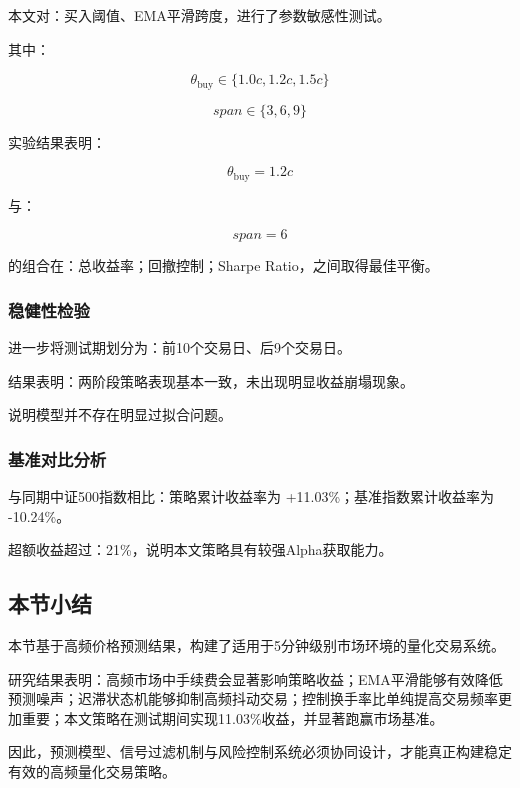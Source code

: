 \documentclass[withoutpreface,bwprint]{cumcmthesis}
\begin{document}
本文对：买入阈值、EMA平滑跨度，进行了参数敏感性测试。

其中：

\begin{equation}
\theta_{\text{buy}}\in\{1.0c,1.2c,1.5c\}
\end{equation}

\begin{equation}
span\in\{3,6,9\}
\end{equation}

实验结果表明：

\begin{equation}
\theta_{\text{buy}}=1.2c
\end{equation}

与：

\begin{equation}
span=6
\end{equation}

的组合在：总收益率；回撤控制；Sharpe Ratio，之间取得最佳平衡。

\subsubsection{稳健性检验}

进一步将测试期划分为：前10个交易日、后9个交易日。

结果表明：两阶段策略表现基本一致，未出现明显收益崩塌现象。

说明模型并不存在明显过拟合问题。

\subsubsection{基准对比分析}

与同期中证500指数相比：策略累计收益率为 +11.03\%；基准指数累计收益率为 -10.24\%。

超额收益超过：21\%，说明本文策略具有较强Alpha获取能力。

\subsection{本节小结}

本节基于高频价格预测结果，构建了适用于5分钟级别市场环境的量化交易系统。

研究结果表明：高频市场中手续费会显著影响策略收益；EMA平滑能够有效降低预测噪声；迟滞状态机能够抑制高频抖动交易；控制换手率比单纯提高交易频率更加重要；本文策略在测试期间实现11.03\%收益，并显著跑赢市场基准。

因此，预测模型、信号过滤机制与风险控制系统必须协同设计，才能真正构建稳定有效的高频量化交易策略。
\end{document}
